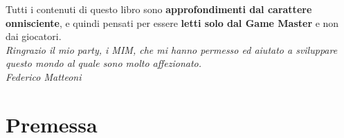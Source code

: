 \documentclass[10pt,twoside,onecolumn,openany]{book}
\begin{document}
\selectfont %
\begin{Large}
\begin{center}
Tutti i contenuti di questo libro sono \textbf{approfondimenti dal carattere onnisciente}, e quindi pensati per essere \textbf{letti solo dal Game Master} e non dai giocatori.\\
\textit{Ringrazio il mio party, i MIM, che mi hanno permesso ed aiutato a sviluppare questo mondo al quale sono molto affezionato.\\Federico Matteoni}
\end{center}
\end{Large}
\pagebreak
\chapter{Premessa}
\end{document}
